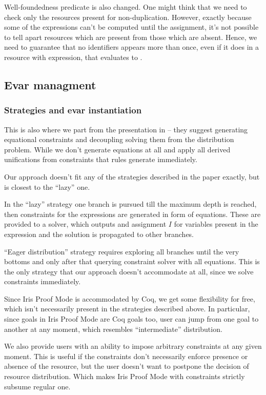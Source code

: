 {Well-foundedness predicate is also changed.
One might think that we need to check only the resources present for non-duplication.
However, exactly because some of the expressions can't be computed until the assignment, it's not possible to tell apart resources which are present from those which are absent.
Hence, we need to guarantee that no identifiers appears more than once, even if it does in a resource with expression, that evaluates to \false.

\subsection{Evar managment}
\label{subsec:evar_managment}

\subsubsection{Strategies and evar instantiation}
\label{subsubsec:strategies_and_evars}

This is also where we part from the presentation in \citet{harlandResourceDistributionBooleanConstraints2003} -- they suggest generating equational constraints and decoupling solving them from the distribution problem.
While we don't generate equations at all and apply all derived unifications from constraints that rules generate immediately.

Our approach doesn't fit any of the strategies described in the paper exactly, but is closest to the ``lazy'' one.

In the ``lazy'' strategy one branch is pursued till the maximum depth is reached, then constraints for the expressions are generated in form of equations.
These are provided to a solver, which outputs and assignment \(I\) for variables present in the expression and the solution is propagated to other branches.

``Eager distribution'' strategy requires exploring all branches until the very bottoms and only after that querying constraint solver with all equations.
This is the only strategy that our approach doesn't accommodate at all, since we solve constraints immediately.

Since Iris Proof Mode is accommodated by Coq, we get some flexibility for free, which isn't necessarily present in the strategies described above.
In particular, since goals in Iris Proof Mode are Coq goals too, user can jump from one goal to another at any moment, which resembles ``intermediate'' distribution.

We also provide users with an ability to impose arbitrary constraints at any given moment.
This is useful if the constraints don't necessarily enforce presence or absence of the resource, but the user doesn't want to postpone the decision of resource distribution.
Which makes Iris Proof Mode with constraints strictly subsume regular one.


}

